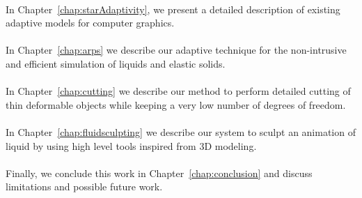 \paragraph*{}
In Chapter~\ref{chap:starAdaptivity}, we present a detailed description of existing adaptive models for computer graphics.
\paragraph*{}
In Chapter~\ref{chap:arps} we describe our adaptive technique for the non-intrusive and efficient simulation of liquids and elastic solids.
\paragraph*{}
In Chapter~\ref{chap:cutting} we describe our method to perform detailed cutting of thin deformable objects while keeping a very low number of degrees of freedom.
\paragraph*{}
In Chapter~\ref{chap:fluidsculpting} we describe our system to sculpt an animation of liquid by using high level tools inspired from 3D modeling.
\paragraph*{}
Finally, we conclude this work in Chapter~\ref{chap:conclusion} and discuss limitations and possible future work.

